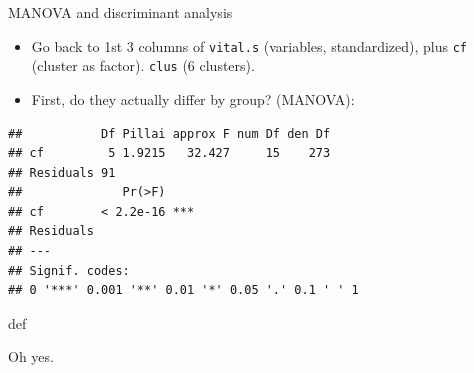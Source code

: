 \documentclass[ignorenonframetext,]{beamer}
\newenvironment{Shaded}{\begin{snugshade}}{\end{snugshade}}
\newcommand{\DecValTok}[1]{\textcolor[rgb]{0.00,0.00,0.81}{#1}}
\newcommand{\KeywordTok}[1]{\textcolor[rgb]{0.13,0.29,0.53}{\textbf{#1}}}
\newcommand{\NormalTok}[1]{#1}
\newcommand{\OperatorTok}[1]{\textcolor[rgb]{0.81,0.36,0.00}{\textbf{#1}}}
\newcommand{\StringTok}[1]{\textcolor[rgb]{0.31,0.60,0.02}{#1}}
\begin{document}
\begin{frame}[fragile]{MANOVA and discriminant analysis}
\protect\hypertarget{manova-and-discriminant-analysis}{}

\begin{itemize}
\item
  Go back to 1st 3 columns of \texttt{vital.s} (variables,
  standardized), plus \texttt{cf} (cluster as factor). \texttt{clus} (6
  clusters).
\item
  First, do they actually differ by group? (MANOVA):
\end{itemize}

\begin{Shaded}
\end{Shaded}

\begin{verbatim}
##           Df Pillai approx F num Df den Df
## cf         5 1.9215   32.427     15    273
## Residuals 91                              
##              Pr(>F)    
## cf        < 2.2e-16 ***
## Residuals              
## ---
## Signif. codes:  
## 0 '***' 0.001 '**' 0.01 '*' 0.05 '.' 0.1 ' ' 1
\end{verbatim}

def

Oh yes.

\end{frame}
\end{document}
